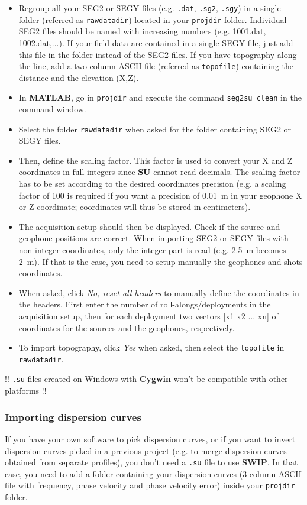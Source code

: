 \documentclass[twoside,a4paper]{article}
\def\SWIP{\textbf{SWIP}}
\def\SU{\textbf{SU}}
\def\MATLAB{\textbf{MATLAB}}
\def\Cygwin{\textbf{Cygwin}}
\begin{document}
\begin{itemize}[leftmargin=*]
\setlength\itemsep{2ex}
\item Regroup all your SEG2 or SEGY files (e.g. \verb|.dat|, \verb|.sg2|, \verb|.sgy|) in a single folder (referred as \verb|rawdatadir|) located in your \verb|projdir| folder. Individual SEG2 files should be named with increasing numbers (e.g. 1001.dat, 1002.dat,...). If your field data are contained in a single SEGY file, just add this file in the folder instead of the SEG2 files. If you have topography along the line, add a two-column ASCII file (referred as \verb|topofile|) containing the distance and the elevation (X,Z).
\item In {\MATLAB}, go in \verb|projdir| and execute the command \verb|seg2su_clean| in the command window.
\item Select the folder \verb|rawdatadir| when asked for the folder containing SEG2 or SEGY files.
\item Then, define the scaling factor. This factor is used to convert your X and Z coordinates in full integers since {\SU} cannot read decimals. The scaling factor has to be set according to the desired coordinates precision (e.g. a scaling factor of 100 is required if you want a precision of 0.01~m in your geophone X or Z coordinate; coordinates will thus be stored in centimeters).
\item The acquisition setup should then be displayed. Check if the source and geophone positions are correct. When importing SEG2 or SEGY files with non-integer coordinates, only the integer part is read (e.g. 2.5~m becomes 2~m). If that is the case, you need to setup manually the geophones and shots coordinates.
\item When asked, click \textit{No, reset all headers} to manually define the coordinates in the headers. First enter the number of roll-alongs/deployments in the acquisition setup, then for each deployment two vectors [x1 x2 ... xn] of coordinates for the sources and the geophones, respectively.
\item To import topography, click \textit{Yes} when asked, then select the \verb|topofile| in \verb|rawdatadir|. 
\end{itemize}

!! \verb|.su| files created on Windows with {\Cygwin} won't be compatible with other platforms !!

\subsubsection{Importing dispersion curves}
\label{sec:import}
If you have your own software to pick dispersion curves, or if you want to invert dispersion curves picked in a previous project (e.g. to merge dispersion curves obtained from separate profiles), you don't need a \verb|.su| file to use {\SWIP}. In that case, you need to add a folder containing your dispersion curves (3-column ASCII file with frequency, phase velocity and phase velocity error) inside your \verb|projdir| folder.
\end{document}
